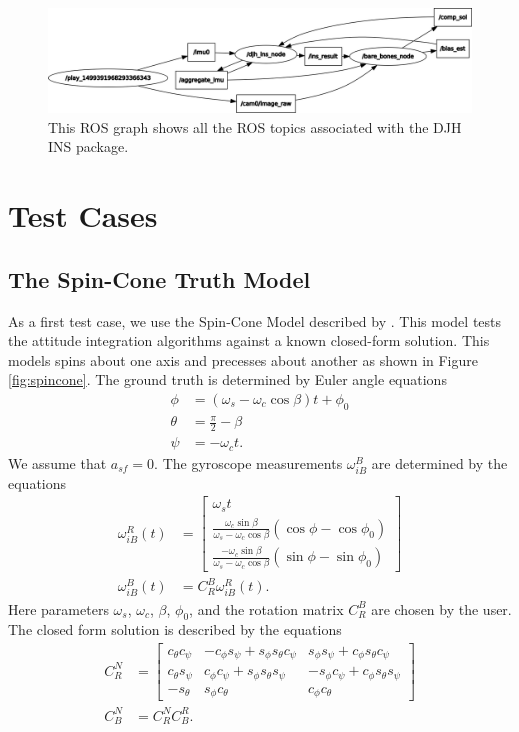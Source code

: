 \documentclass[11pt,a4paper]{article}
\begin{document}
\begin{figure}
	\centering
	\includegraphics[scale=0.37]{finalgraph}
	\caption{This ROS graph shows all the ROS topics associated with the DJH INS package.}
	\label{fig:finalgraph}
\end{figure}

\section{Test Cases}

\subsection{The Spin-Cone Truth Model}

As a first test case, we use the Spin-Cone Model described by \cite{Savage:2009}. This model tests the attitude integration algorithms against a known closed-form solution. This models spins about one axis and precesses about another as shown in Figure \ref{fig:spincone}. The ground truth is determined by Euler angle equations
\begin{align}
	\phi & =\left(\omega_s - \omega_c \cos \beta\right) t + \phi_0 \\
	\theta & = \frac{\pi}{2} - \beta \\ 
	\psi & = -\omega_c t.
\end{align}
We assume that $a_{sf} = 0$. The gyroscope measurements $\omega^B_{iB}$ are determined by the equations
\begin{align}
	\omega^R_{iB}(t) & = \left[\begin{array}{c}\omega_s t \\ \frac{\omega_c\sin\beta}{\omega_s-\omega_c\cos\beta}\left(\cos\phi - \cos\phi_0\right) \\ \frac{-\omega_c \sin\beta}{\omega_s-\omega_c\cos\beta}\left(\sin\phi-\sin\phi_0\right)\end{array}\right] \\
	\omega^B_{iB}(t) & = C^B_R\omega^R_{iB}(t).
\end{align}
Here parameters $\omega_s$, $\omega_c$, $\beta$, $\phi_0$, and the rotation matrix $C^B_R$ are chosen by the user. The closed form solution is described by the equations
\begin{align}
	C^N_R & = \left[\begin{array}{ccc} c_\theta c_\psi & -c_\phi s_\psi+s_\phi s_\theta c_\psi & s_\phi s_\psi + c_\phi s_\theta c_\psi \\
	c_\theta s_\psi & c_\phi c_\psi + s_\phi s_\theta s_\psi & -s_\phi c_\psi + c_\phi s_\theta s_\psi \\
	-s_\theta & s_\phi c_\theta & c_\phi c_\theta \end{array}\right] \\
	C^N_B & = C^N_R C^R_B.
\end{align}
\end{document}
